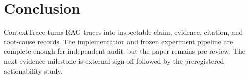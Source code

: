\section{Conclusion}
ContextTrace turns RAG traces into inspectable claim, evidence, citation, and
root-cause records. The implementation and frozen experiment pipeline are
complete enough for independent audit, but the paper remains pre-review. The
next evidence milestone is external sign-off followed by the preregistered
actionability study.
